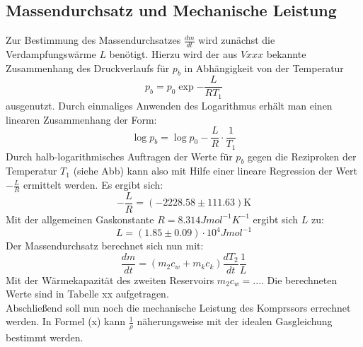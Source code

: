 \subsection{Massendurchsatz und Mechanische Leistung}
Zur Bestimmung des Massendurchsatzes $\frac{dm}{dt}$ wird zunächst die Verdampfungswärme $L$ benötigt. Hierzu wird der aus $Vxxx$ bekannte Zusammenhang des Druckverlaufs für $p_b$ in Abhängigkeit von der Temperatur
\begin{equation}
  p_b = p_0 \exp{-\frac{L}{R T_1}}
\end{equation}
ausgenutzt. Durch einmaliges Anwenden des Logarithmus erhält man einen linearen Zusammenhang der Form:
\begin{equation}
  \log{p_b} = \log{p_0} -\frac{L}{R} \cdot \frac{1}{T_1}
\end{equation}
Durch halb-logarithmisches Auftragen der Werte für $p_b$ gegen die Reziproken der Temperatur $T_1$ (siehe Abb) kann also mit Hilfe einer lineare Regression der Wert $-\frac{L}{R}$ ermittelt werden.
Es ergibt sich:
\begin{equation}
  -\frac{L}{R} =  (-2228.58 \pm 111.63) \si{\kelvin}
\end{equation}
Mit der allgemeinen Gaskonstante $R = 8.314 J mol^{-1} K ^{-1}$ ergibt sich $L$ zu:
\begin{equation}
  L = (1.85 \pm 0.09)\cdot 10^{4} J mol^{-1}
\end{equation}
Der Massendurchsatz berechnet sich nun mit:
\begin{equation}
  \frac{dm}{dt} = (m_2 c_w + m_k c_k)\frac{dT_2}{dt} \frac{1}{L}
\end{equation}
Mit der Wärmekapazität des zweiten Reservoirs $m_2 c_w = ...$. Die berechneten Werte sind in Tabelle xx aufgetragen. \\
Abschließend soll nun noch die mechanische Leistung des Komprssors errechnet werden. In Formel (x) kann $\frac{1}{\rho}$
näherungsweise mit der idealen Gasgleichung bestimmt werden.





